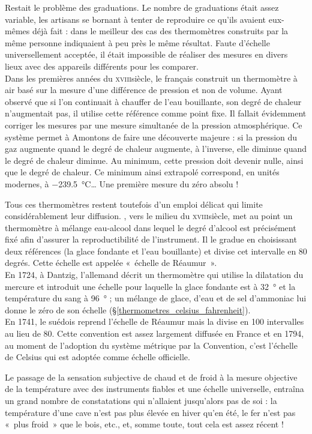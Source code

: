 	Restait le problème des graduations. Le nombre de graduations était assez variable, les artisans se bornant à tenter de reproduire ce qu'ils avaient eux-mêmes déjà fait : dans le meilleur des cas des thermomètres construits par la même personne indiquaient à peu près le même résultat. Faute d'échelle universellement acceptée, il était impossible de réaliser des mesures en divers lieux avec des appareils différents pour les comparer.\\
	Dans les premières années du \textsc{xviii}\ieme siècle, le français  construit un thermomètre à air basé sur la mesure d'une différence de pression et non de volume. Ayant observé que si l'on continuait à chauffer de l'eau bouillante, son degré de chaleur n'augmentait pas, il utilise cette référence comme point fixe. Il fallait évidemment corriger les mesures par une mesure simultanée de la pression atmosphérique. Ce système permet à Amontons de faire une découverte majeure : si la pression du gaz augmente quand le degré de chaleur augmente, à l'inverse, elle diminue quand le degré de chaleur diminue. Au minimum, cette pression doit devenir nulle, ainsi que le degré de chaleur. Ce minimum ainsi extrapolé correspond, en unités modernes, à \SI{-239,5}{\degreeCelsius}… Une première mesure du zéro absolu !
	
	Tous ces thermomètres restent toutefois d'un emploi délicat qui limite considérablement leur diffusion. , vers le milieu du \textsc{xviii}\ieme siècle, met au point un thermomètre à mélange eau-alcool dans lequel le degré d'alcool est précisément fixé afin d'assurer la reproductibilité de l'instrument. Il le gradue en choisissant deux références (la glace fondante et l'eau bouillante) et divise cet intervalle en 80 degrés. Cette échelle est appelée «~échelle de Réaumur~».\\	
	En 1724, à Dantzig, l’allemand  décrit un thermomètre qui utilise la dilatation du mercure et introduit une échelle pour laquelle la glace fondante est à \SI{32}{\degree} et la température du sang à \SI{96}{\degree} ; un mélange de glace, d'eau et de sel d'ammoniac lui donne le zéro de son échelle (\S\ref{thermometres_celsius_fahrenheit}).\\	
	En 1741, le suédois  reprend l'échelle de Réaumur mais la divise en 100 intervalles au lieu de 80. Cette convention est assez largement diffusée en France et en 1794, au moment de l'adoption du système métrique par la Convention, c'est l'échelle de Celsius qui est adoptée comme échelle officielle.

	Le passage de la sensation subjective de chaud et de froid à la mesure objective de la température avec des instruments fiables et une échelle universelle, entraîna un grand nombre de constatations qui n'allaient jusqu'alors pas de soi : la température d'une cave n'est pas plus élevée en hiver qu'en été, le fer n'est pas «~plus froid~» que le bois, etc., et, somme toute, tout cela est assez récent !

\atendofhistorysection
